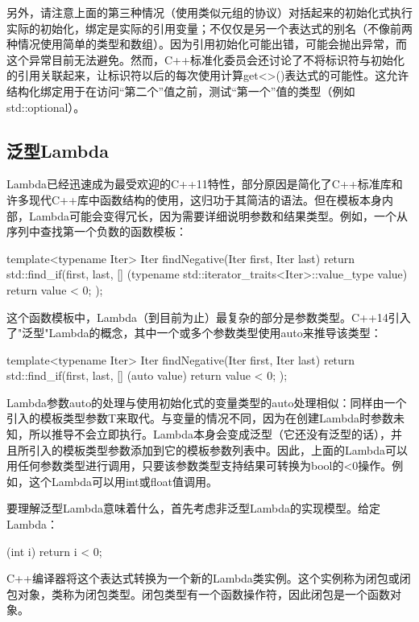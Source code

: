 另外，请注意上面的第三种情况（使用类似元组的协议）对括起来的初始化式执行实际的初始化，绑定是实际的引用变量；不仅仅是另一个表达式的别名（不像前两种情况使用简单的类型和数组）。因为引用初始化可能出错，可能会抛出异常，而这个异常目前无法避免。然而，C++标准化委员会还讨论了不将标识符与初始化的引用关联起来，让标识符以后的每次使用计算get<>()表达式的可能性。这允许结构化绑定用于在访问“第二个”值之前，测试“第一个”值的类型（例如std::optional）。

\subsection{泛型Lambda}

Lambda已经迅速成为最受欢迎的C++11特性，部分原因是简化了C++标准库和许多现代C++库中函数结构的使用，这归功于其简洁的语法。但在模板本身内部，Lambda可能会变得冗长，因为需要详细说明参数和结果类型。例如，一个从序列中查找第一个负数的函数模板：

\begin{cpp}
template<typename Iter>
Iter findNegative(Iter first, Iter last)
{
	return std::find_if(first, last,
						[] (typename std::iterator_traits<Iter>::value_type
						value) {
							return value < 0;
						});
}
\end{cpp}

这个函数模板中，Lambda（到目前为止）最复杂的部分是参数类型。C++14引入了"泛型"Lambda的概念，其中一个或多个参数类型使用auto来推导该类型：

\begin{cpp}
template<typename Iter>
Iter findNegative(Iter first, Iter last)
{
	return std::find_if(first, last,
						[] (auto value) {
							return value < 0;
						});
}
\end{cpp}

Lambda参数auto的处理与使用初始化式的变量类型的auto处理相似：同样由一个引入的模板类型参数T来取代。与变量的情况不同，因为在创建Lambda时参数未知，所以推导不会立即执行。Lambda本身会变成泛型（它还没有泛型的话），并且所引入的模板类型参数添加到它的模板参数列表中。因此，上面的Lambda可以用任何参数类型进行调用，只要该参数类型支持结果可转换为bool的<0操作。例如，这个Lambda可以用int或float值调用。

要理解泛型Lambda意味着什么，首先考虑非泛型Lambda的实现模型。给定Lambda：

\begin{cpp}
[] (int i) {
	return i < 0;
}
\end{cpp}

C++编译器将这个表达式转换为一个新的Lambda类实例。这个实例称为闭包或闭包对象，类称为闭包类型。闭包类型有一个函数操作符，因此闭包是一个函数对象。


